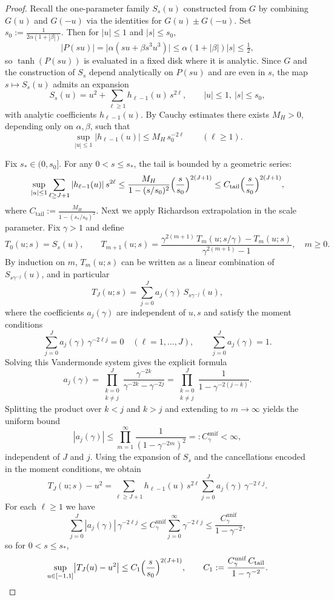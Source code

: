 \documentclass{article}
\theoremstyle{plain}
\theoremstyle{definition}
\theoremstyle{remark}
\begin{document}
\begin{proof}
Recall the one-parameter family $S_s(u)$ constructed from $G$ by combining $G(u)$ and $G(-u)$ via the identities for $G(u)\pm G(-u)$. Set \(s_0:=\frac{1}{2\alpha(1+|\beta|)}.\) Then for $|u|\le 1$ and $|s|\le s_0$,
\[
|P(su)|=\bigl|\alpha(su+\beta s^3 u^3)\bigr|
\le \alpha(1+|\beta|)|s|\le \tfrac12,
\]
so $\tanh(P(su))$ is evaluated in a fixed disk where it is analytic. Since $G$ and the construction of $S_s$ depend analytically on $P(su)$ and are even in $s$, the map $s\mapsto S_s(u)$ admits an expansion
\[
S_s(u)
=
u^2 + \sum_{\ell\ge 1} h_{\ell-1}(u)\,s^{2\ell},
\qquad |u|\le 1,\ |s|\le s_0,
\]
with analytic coefficients $h_{\ell-1}(u)$. By Cauchy estimates there exists $M_H>0$, depending only on $\alpha,\beta$, such that
\[
\sup_{|u|\le 1}|h_{\ell-1}(u)|\le M_H\,s_0^{-2\ell}\qquad(\ell\ge 1).
\]

Fix $s_*\in(0,s_0]$. For any $0<s\le s_*$, the tail is bounded by a geometric series:
\[
\sup_{|u|\le 1}
\sum_{\ell\ge J+1} |h_{\ell-1}(u)|\,s^{2\ell}
\le
\frac{M_H}{1-(s/s_0)^2}\Bigl(\frac{s}{s_0}\Bigr)^{2(J+1)}
\le
C_{\mathrm{tail}}\Bigl(\frac{s}{s_0}\Bigr)^{2(J+1)},
\]
where \(C_{\mathrm{tail}} := \frac{M_H}{1-(s_*/s_0)^2}. \) Next we apply Richardson extrapolation in the scale parameter. Fix $\gamma>1$ and define
\[
T_0(u;s)=S_s(u),\qquad
T_{m+1}(u;s)
=
\frac{\gamma^{2(m+1)}\,T_m(u;s/\gamma)-T_m(u;s)}{\gamma^{2(m+1)}-1},
\quad m\ge 0.
\]
By induction on $m$, $T_m(u;s)$ can be written as a linear combination of $S_{s\gamma^{-j}}(u)$, and in particular
\[
T_J(u;s)
=
\sum_{j=0}^J a_j(\gamma)\,S_{s\gamma^{-j}}(u),
\]
where the coefficients $a_j(\gamma)$ are independent of $u,s$ and satisfy the moment conditions
\[
\sum_{j=0}^{J} a_j(\gamma)\,\gamma^{-2\ell j}=0\quad(\ell=1,\dots,J),
\qquad
\sum_{j=0}^{J} a_j(\gamma)=1.
\]
Solving this Vandermonde system gives the explicit formula
\[
a_j(\gamma)
=
\prod_{\substack{k=0\\k\ne j}}^{J}
\frac{\gamma^{-2k}}{\gamma^{-2k}-\gamma^{-2j}}
=
\prod_{\substack{k=0\\k\ne j}}^{J}
\frac{1}{1-\gamma^{-2(j-k)}}.
\]
Splitting the product over $k<j$ and $k>j$ and extending to $m\to\infty$ yields the uniform bound
\[
|a_j(\gamma)|
\le
\prod_{m=1}^{\infty}\frac{1}{(1-\gamma^{-2m})^2}
=:C_\gamma^{\mathrm{unif}}<\infty,
\]
independent of $J$ and $j$. Using the expansion of $S_s$ and the cancellations encoded in the moment conditions, we obtain
\[
T_J(u;s)-u^2
=
\sum_{\ell\ge J+1} h_{\ell-1}(u)\,s^{2\ell}
\sum_{j=0}^{J} a_j(\gamma)\,\gamma^{-2\ell j}.
\]
For each $\ell\ge 1$ we have
\[
\sum_{j=0}^{J} |a_j(\gamma)|\,\gamma^{-2\ell j}
\le
C_\gamma^{\mathrm{unif}}
\sum_{j=0}^{\infty}\gamma^{-2\ell j}
\le
\frac{C_\gamma^{\mathrm{unif}}}{1-\gamma^{-2}},
\]
so for $0<s\le s_*$,
\[
\sup_{u\in[-1,1]}\bigl|T_J(u)-u^2\bigr|
\le
C_1\Bigl(\frac{s}{s_0}\Bigr)^{2(J+1)},
\qquad
C_1
:=
\frac{C_\gamma^{\mathrm{unif}}\,C_{\mathrm{tail}}}{1-\gamma^{-2}}.
\]


\end{proof}
\end{document}
